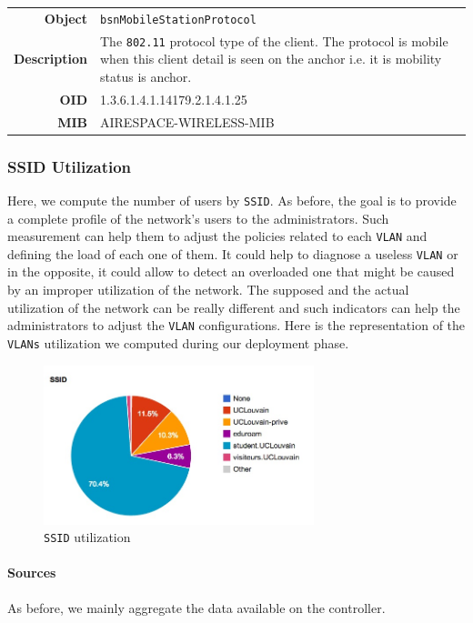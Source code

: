 \noindent
\begin{tabular}{|r l|}
\hline 
\textbf{Object} & \texttt{bsnMobileStationProtocol} \\
\textbf{Description} & \parbox{11cm}{The \texttt{802.11} protocol type of the client. The protocol is mobile when this client detail is seen on the anchor i.e. it is mobility status is anchor.} \\
\textbf{OID} & 1.3.6.1.4.1.14179.2.1.4.1.25 \\
\textbf{MIB} & AIRESPACE-WIRELESS-MIB \\
\hline
\end{tabular}

\subsubsection*{SSID Utilization}
Here, we compute the number of users by \texttt{SSID}. As before, the goal is to provide a complete profile of the network's users to the administrators. Such measurement can help them to adjust the policies related to each \texttt{VLAN} and defining the load of each one of them. It could help to diagnose a useless \texttt{VLAN} or in the opposite, it could allow to detect an overloaded one that might be caused by an improper utilization of the network. The supposed and the actual utilization of the network can be really different and such indicators can help the administrators to adjust the \texttt{VLAN} configurations. Here is the representation of the \texttt{VLANs} utilization we computed during our deployment phase.
\begin{figure}[H]
	\centering
   \includegraphics[width=0.7\textwidth]{Pictures/chapter5/ssid-utilization.jpg}
   \caption{\texttt{SSID} utilization}
\end{figure} 

\paragraph*{Sources} As before, we mainly aggregate the data available on the controller.

